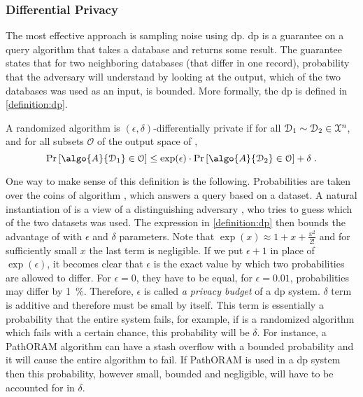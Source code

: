 			\subsubsection{Differential Privacy}

				The most effective approach is sampling noise using \acrfull{dp}.
				\acrshort{dp} is a guarantee on a query algorithm that takes a database and returns some result.
				The guarantee states that for two neighboring databases (that differ in one record), probability that the adversary will understand by looking at the output, which of the two databases was used as an input, is bounded.
				More formally, the \acrshort{dp} is defined in \cref{definition:dp}.

				\begin{definition}\label{definition:dp}
					A randomized algorithm  is $(\epsilon, \delta)$-differentially private if for all $\mathcal{D}_1 \sim \mathcal{D}_2 \in \mathcal{X}^{n}$, and for all subsets $\mathcal{O}$ of the output space of ,
					\[
						\probability{ \algo{A}{ \database_1 } \in \mathcal{O} } \leq \exp(\epsilon) \cdot \probability{ \algo{A}{ \database_2 } \in \mathcal{O} } + \delta \; .
					\]
				\end{definition}

				One way to make sense of this definition is the following.
				Probabilities are taken over the coins of algorithm , which answers a query based on a dataset.
				A natural instantiation of  is a view of a distinguishing adversary \adversary{}, who tries to guess which of the two datasets was used.
				The expression in \cref{definition:dp} then bounds the advantage of \adversary{} with $\epsilon$ and $\delta$ parameters.
				Note that $\exp( x ) \approx 1 + x + \frac{x^2}{2!}$ and for sufficiently small $x$ the last term is negligible.
				If we put $\epsilon + 1$ in place of $\exp( \epsilon )$, it becomes clear that $\epsilon$ is the exact value by which two probabilities are allowed to differ.
				For $\epsilon = 0$, they have to be equal, for $\epsilon = 0.01$, probabilities may differ by \SI{1}{\percent}.
				Therefore, $\epsilon$ is called \emph{a privacy budget} of a \acrshort{dp} system.
				$\delta$ term is additive and therefore must be small by itself.
				This term is essentially a probability that the entire system fails, for example, if  is a randomized algorithm which fails with a certain chance, this probability will be $\delta$.
				For instance, a PathORAM \cite{path-oram} algorithm can have a stash overflow with a bounded probability \cite[Theorem 1]{path-oram} and it will cause the entire algorithm to fail.
				If PathORAM is used in a \acrshort{dp} system then this probability, however small, bounded and negligible, will have to be accounted for in $\delta$.

